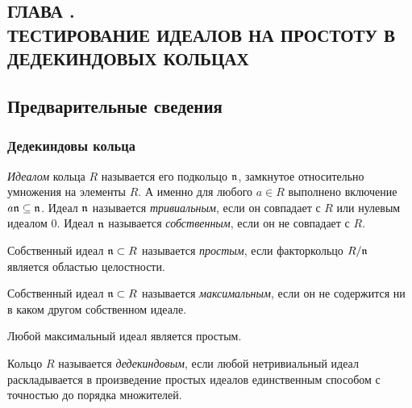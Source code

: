 \documentclass[_00_dissertation.tex]{subfiles}
\begin{document}
\onlyinsubfile{
    \renewcommand{\contentsname}{ОГЛАВЛЕНИЕ}
    \setcounter{tocdepth}{3}
    \tableofcontents
}

\begin{center}
    \chapter*{ГЛАВА .\\ ТЕСТИРОВАНИЕ ИДЕАЛОВ НА ПРОСТОТУ В ДЕДЕКИНДОВЫХ КОЛЬЦАХ}\label{chapter:Primality}
\end{center}

\section{Предварительные сведения}

\subsection{Дедекиндовы кольца}

\begin{definition}
    \emph{Идеалом} кольца $R$ называется его подкольцо $\mathfrak{n}$, замкнутое относительно умножения на элементы $R$.
    А именно для любого $a \in R$ выполнено включение $a\mathfrak{n} \subseteq \mathfrak{n}$.
    Идеал $\mathfrak{n}$ называется \emph{тривиальным}, если он совпадает с $R$ или нулевым идеалом $0$.
    Идеал $\mathfrak{n}$ называется \emph{собственным}, если он не совпадает с $R$.
\end{definition}

\begin{definition}
    Собственный идеал $\mathfrak{n} \subset R$ называется \emph{простым}, если факторкольцо $R/\mathfrak{n}$ является областью целостности.
\end{definition}

\begin{definition}
    Собственный идеал $\mathfrak{n} \subset R$ называется \emph{максимальным}, если он не содержится ни в каком другом собственном идеале.
\end{definition}

\begin{remark}
    Любой максимальный идеал является простым.
\end{remark}

\begin{definition}
    Кольцо $R$ называется \emph{дедекиндовым}, если любой нетривиальный идеал раскладывается в произведение простых идеалов единственным способом с точностью до порядка множителей.
\end{definition}
\end{document}
